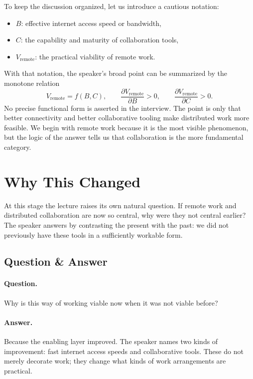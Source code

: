 To keep the discussion organized, let us introduce a cautious notation:
\begin{itemize}
\item \(B\): effective internet access speed or bandwidth,
\item \(C\): the capability and maturity of collaboration tools,
\item \(V_{\mathrm{remote}}\): the practical viability of remote work.
\end{itemize}
With that notation, the speaker's broad point can be summarized by the monotone relation
\begin{equation}
V_{\mathrm{remote}} = f(B,C),
\qquad
\frac{\partial V_{\mathrm{remote}}}{\partial B} > 0,
\qquad
\frac{\partial V_{\mathrm{remote}}}{\partial C} > 0 .
\end{equation}
No precise functional form is asserted in the interview. The point is only that better connectivity and better collaborative tooling make distributed work more feasible. We begin with remote work because it is the most visible phenomenon, but the logic of the answer tells us that collaboration is the more fundamental category.

\section{Why This Changed}

At this stage the lecture raises its own natural question. If remote work and distributed collaboration are now so central, why were they not central earlier? The speaker answers by contrasting the present with the past: we did not previously have these tools in a sufficiently workable form.

\subsection{Question \& Answer}

\paragraph{Question.} Why is this way of working viable now when it was not viable before?

\paragraph{Answer.} Because the enabling layer improved. The speaker names two kinds of improvement: fast internet access speeds and collaborative tools. These do not merely decorate work; they change what kinds of work arrangements are practical.

